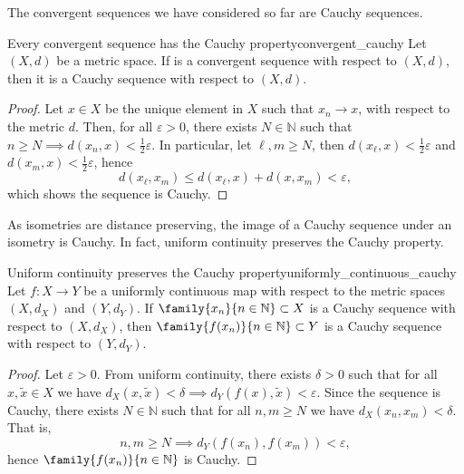 The convergent sequences we have considered so far are Cauchy sequences.
\begin{proposition}{Every convergent sequence has the Cauchy property}{convergent_cauchy}
    Let \((X, d)\) be a metric space. If  is a convergent sequence with respect to \((X, d)\), then it is a Cauchy sequence with respect to \((X, d)\).
\end{proposition}
\begin{proof}
    Let \(x \in X\) be the unique element in \(X\) such that \(x_n \to x\), with respect to the metric \(d\). Then, for all \(\varepsilon > 0\), there exists \(N \in \mathbb{N}\) such that \(n \geq N \implies d(x_n, x) < \frac12\varepsilon.\) In particular, let \(\ell, m \geq N\), then \(d(x_\ell, x) < \frac12 \varepsilon\) and \(d(x_m, x) < \frac12 \varepsilon\), hence
    \begin{equation*}
        d(x_\ell, x_m) \leq d(x_\ell, x) + d(x, x_m) < \varepsilon,
    \end{equation*}
    which shows the sequence is Cauchy.
\end{proof}

As isometries are distance preserving, the image of a Cauchy sequence under an isometry is Cauchy. In fact, uniform continuity preserves the Cauchy property.
\begin{proposition}{Uniform continuity preserves the Cauchy property}{uniformly_continuous_cauchy}
    Let \(f : X \to Y\) be a uniformly continuous map with respect to the metric spaces \((X, d_X)\) and \((Y, d_Y)\). If \(\family{x_n}{n\in \mathbb{N}} \subset X\) is a Cauchy sequence with respect to \((X, d_X)\), then \(\family{f(x_n)}{n\in \mathbb{N}} \subset Y\) is a Cauchy sequence with respect to \((Y, d_Y)\).
\end{proposition}
\begin{proof}
    Let \(\varepsilon > 0\). From uniform continuity, there exists \(\delta > 0\) such that for all \(x, \tilde{x} \in X\) we have \(d_X(x, \tilde{x}) < \delta \implies d_Y(f(x), \tilde{x}) < \varepsilon.\) Since the sequence is Cauchy, there exists \(N \in \mathbb{N}\) such that for all \(n, m \geq N\) we have \(d_X(x_n, x_m) < \delta\). That is,
    \begin{equation*}
        n,m\geq N \implies d_Y(f(x_n), f(x_m)) < \varepsilon,
    \end{equation*}
    hence \(\family{f(x_n)}{n\in \mathbb{N}}\) is Cauchy.
\end{proof}

